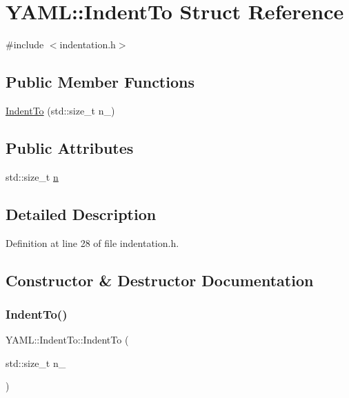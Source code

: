 \hypertarget{struct_y_a_m_l_1_1_indent_to}{}\section{Y\+A\+ML\+::Indent\+To Struct Reference}
\label{struct_y_a_m_l_1_1_indent_to}


{\ttfamily \#include $<$indentation.\+h$>$}

\subsection*{Public Member Functions}
\begin{DoxyCompactItemize}
\item 
\mbox{\hyperlink{struct_y_a_m_l_1_1_indent_to_a222d2b266d7c1aeb5896cfc8a2f09aa4}{Indent\+To}} (std\+::size\+\_\+t n\+\_\+)
\end{DoxyCompactItemize}
\subsection*{Public Attributes}
\begin{DoxyCompactItemize}
\item 
std\+::size\+\_\+t \mbox{\hyperlink{struct_y_a_m_l_1_1_indent_to_a1764c03236ec9fbd8dca626c0e43abb6}{n}}
\end{DoxyCompactItemize}


\subsection{Detailed Description}


Definition at line 28 of file indentation.\+h.



\subsection{Constructor \& Destructor Documentation}
\mbox{\label{struct_y_a_m_l_1_1_indent_to_a222d2b266d7c1aeb5896cfc8a2f09aa4}} 
\subsubsection{\texorpdfstring{IndentTo()}{IndentTo()}}
{\footnotesize\ttfamily Y\+A\+M\+L\+::\+Indent\+To\+::\+Indent\+To (\begin{DoxyParamCaption}\item[{std\+::size\+\_\+t}]{n\+\_\+ }\end{DoxyParamCaption})\hspace{0.3cm}{\ttfamily [inline]}}



